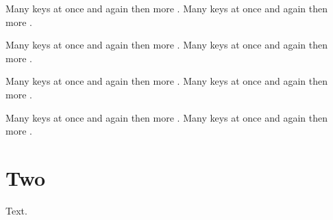 \documentclass{article}
\begin{document}
Many keys \citep{a,b,c,d,e,f,g,h} at once \citep{a,b,c,d,e,f,g,h} and again \citep{a,b,c,d,e,f,g,h} then \citep{a,b,c,d,e,f,g,h} more \citep{a,b,c,d,e,f,g,h}. Many keys \citep{a,b,c,d,e,f,g,h} at once \citep{a,b,c,d,e,f,g,h} and again \citep{a,b,c,d,e,f,g,h} then \citep{a,b,c,d,e,f,g,h} more \citep{a,b,c,d,e,f,g,h}.

Many keys \citep{a,b,c,d,e,f,g,h} at once \citep{a,b,c,d,e,f,g,h} and again \citep{a,b,c,d,e,f,g,h} then \citep{a,b,c,d,e,f,g,h} more \citep{a,b,c,d,e,f,g,h}. Many keys \citep{a,b,c,d,e,f,g,h} at once \citep{a,b,c,d,e,f,g,h} and again \citep{a,b,c,d,e,f,g,h} then \citep{a,b,c,d,e,f,g,h} more \citep{a,b,c,d,e,f,g,h}.

Many keys \citep{a,b,c,d,e,f,g,h} at once \citep{a,b,c,d,e,f,g,h} and again \citep{a,b,c,d,e,f,g,h} then \citep{a,b,c,d,e,f,g,h} more \citep{a,b,c,d,e,f,g,h}. Many keys \citep{a,b,c,d,e,f,g,h} at once \citep{a,b,c,d,e,f,g,h} and again \citep{a,b,c,d,e,f,g,h} then \citep{a,b,c,d,e,f,g,h} more \citep{a,b,c,d,e,f,g,h}.

Many keys \citep{a,b,c,d,e,f,g,h} at once \citep{a,b,c,d,e,f,g,h} and again \citep{a,b,c,d,e,f,g,h} then \citep{a,b,c,d,e,f,g,h} more \citep{a,b,c,d,e,f,g,h}. Many keys \citep{a,b,c,d,e,f,g,h} at once \citep{a,b,c,d,e,f,g,h} and again \citep{a,b,c,d,e,f,g,h} then \citep{a,b,c,d,e,f,g,h} more \citep{a,b,c,d,e,f,g,h}.

\section{Two}
Text.


\end{document}
